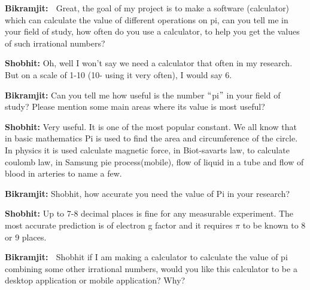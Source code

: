 \documentclass[12pt]{article}
\begin{document}
\begin{justify}
\textbf{Bikramjit:  }Great, the goal of my project is to make a software (calculator) which can calculate the value of different operations on pi, can you tell me in your field of study, how often do you use a calculator, to help you get the values of such irrational numbers?
\end{justify}\par

\begin{justify}
\textbf{Shobhit: }Oh, well I won’t say we need a calculator that often in my research. But on a scale of 1-10 (10- using it very often), I would say 6.
\end{justify}\par

\begin{justify}
\textbf{Bikramjit: }Can you tell me how useful is the number $``$pi$"$  in your field of study? Please mention some main areas where its value is most useful?
\end{justify}\par

\begin{justify}
\textbf{Shobhit: }Very useful. It is one of the most popular constant. We all know that in basic mathematics Pi is used to find the area and circumference of the circle. In physics it is used calculate magnetic force, in Biot-savarts law, to calculate coulomb law, in Samsung pie process(mobile), flow of liquid in a tube and flow of blood in arteries to name a few.
\end{justify}\par

\begin{justify}
\textbf{Bikramjit: }Shobhit, how accurate you need the value of Pi in your research?
\end{justify}\par

\begin{justify}
\textbf{Shobhit: }Up to 7-8 decimal places is fine for any measurable experiment. The most accurate prediction is of electron g factor and it requires $ \pi $  to be known to 8 or 9 places.
\end{justify}\par

\begin{justify}
\textbf{Bikramjit:  }Shobhit if I am making a calculator to calculate the value of pi combining some other irrational numbers, would you like this calculator to be a desktop application or mobile application? Why?
\end{justify}\par
\end{document}
